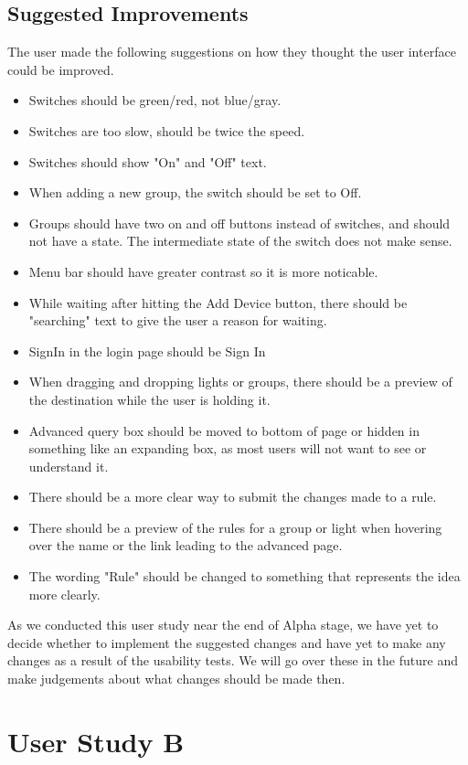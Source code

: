 \documentclass[oneside,openright]{book}
\begin{document}
\subsection{Suggested Improvements}
The user made the following suggestions on how they thought the user interface could be improved.
\begin{itemize}
  \item Switches should be green/red, not blue/gray.
  \item Switches are too slow, should be twice the speed.
  \item Switches should show "On" and "Off" text.
  \item When adding a new group, the switch should be set to Off.
  \item Groups should have two on and off buttons instead of switches, and should not have a state. The intermediate state of the switch does not make sense.
  \item Menu bar should have greater contrast so it is more noticable.
  \item While waiting after hitting the Add Device button, there should be "searching" text to give the user a reason for waiting.
  \item SignIn in the login page should be Sign In
  \item When dragging and dropping lights or groups, there should be a preview of the destination while the user is holding it.
  \item Advanced query box should be moved to bottom of page or hidden in something like an expanding box, as most users will not want to see or understand it.
  \item There should be a more clear way to submit the changes made to a rule.
  \item There should be a preview of the rules for a group or light when hovering over the name or the link leading to the advanced page.
  \item The wording "Rule" should be changed to something that represents the idea more clearly.
\end{itemize}
As we conducted this user study near the end of Alpha stage, we have yet to decide whether to implement the suggested changes and have yet to make any changes as a result of the usability tests. We will go over these in the future and make judgements about what changes should be made then.

\section{User Study B}
\end{document}
